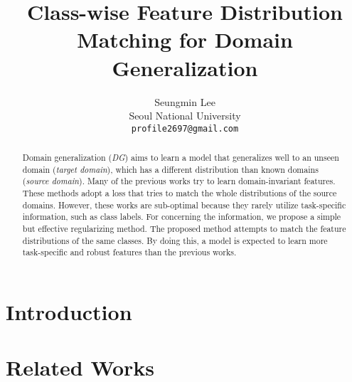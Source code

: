 \documentclass[10pt,twocolumn,letterpaper]{article}
\begin{document}
\title{Class-wise Feature Distribution Matching for Domain Generalization}

\author{Seungmin Lee\\
Seoul National University\\
{\tt\small profile2697@gmail.com}
}

\maketitle

\begin{abstract}
 Domain generalization (\textit{DG}) aims to learn a model that generalizes well to an unseen domain (\textit{target domain}), which has a different distribution than known domains (\textit{source domain}). Many of the previous works try to learn domain-invariant features. These methods adopt a loss that tries to match the whole distributions of the source domains. However, these works are sub-optimal because they rarely utilize task-specific information, such as class labels. For concerning the information, we propose a simple but effective regularizing method. The proposed method attempts to match the feature distributions of the same classes. By doing this, a model is expected to learn more task-specific and robust features than the previous works.
\end{abstract}

\section{Introduction}


\section{Related Works}




{\small


}
\end{document}
